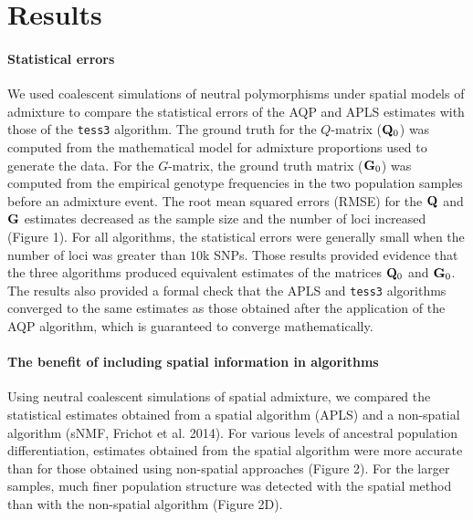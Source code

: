 \clearpage
\newpage


\section{Results}
\paragraph{Statistical errors}  We used  coalescent simulations of neutral polymorphisms under spatial models of admixture to compare the statistical errors of the AQP and APLS estimates with those of the {\tt tess3} algorithm. The ground truth for the $Q$-matrix (${\bf Q}_0$)  was computed from the mathematical model for admixture proportions used to generate the data. For the $G$-matrix, the  ground truth matrix (${\bf G}_0$) was computed from the empirical genotype frequencies in the two population samples before an admixture event.  The root mean squared errors (RMSE) for the ${\bf Q}$ and ${\bf G}$ estimates decreased as the sample size and the number of loci increased (Figure 1). For all algorithms, the statistical errors were generally small when the number of loci was greater than $10$k SNPs. Those results provided evidence that the three algorithms produced equivalent estimates of the matrices ${\bf Q}_0$ and ${\bf G}_0$. The results also provided a formal check that the APLS and {\tt tess3} algorithms converged to the same estimates as those obtained after the application of  the AQP algorithm, which is guaranteed to converge mathematically.   


\paragraph{The benefit of including spatial information in algorithms}    Using  neutral coalescent simulations of spatial admixture, we compared the statistical estimates obtained from a spatial algorithm (APLS) and a non-spatial algorithm (sNMF, Frichot et al. 2014).  For various levels of ancestral population differentiation, estimates obtained from the spatial algorithm were more accurate than for those obtained using non-spatial approaches (Figure 2). For the larger samples, much finer population structure was detected with the spatial method than with the non-spatial algorithm (Figure 2D). 

